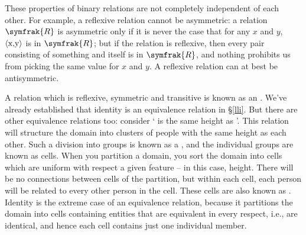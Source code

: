 \begin{earg}
These properties of binary relations are not completely independent of each other. For example, a reflexive relation cannot be asymmetric: a relation $\symfrak{R}$ is asymmetric only if it is never the case that for any $x$ and $y$, $\mbox{\ensuremath{\mathopen{\langle}}x,y\ensuremath{\mathclose{\rangle}}}$ is in $\symfrak{R}$; but if the relation is reflexive, then every pair consisting of something and itself is in $\symfrak{R}$, and nothing prohibits us from picking the same value for $x$ and $y$. A reflexive relation can at best be antisymmetric. 


A relation which is reflexive, symmetric and transitive is known as an . We've already established that identity is an equivalence relation in §\ref{lli}. But there are other equivalence relations too: consider ` is the same height as '. This relation will structure the domain into clusters of people with the same height as each other. Such a division into groups is known as a , and the individual groups are known as cells. When you partition a domain, you sort the domain into cells which are uniform with respect a given feature – in this case, height. There will be no connections between cells of the partition, but within each cell, each person will be related to every other person in the cell. These cells are also known as . Identity is the extreme case of an equivalence relation, because it partitions the domain into cells containing entities that are equivalent in every respect, i.e., are identical, and hence each cell contains just one individual member.


\end{earg}
